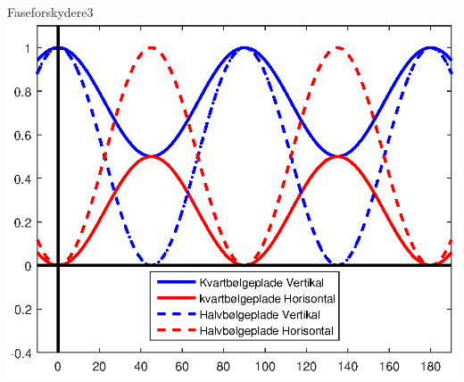 \begin{opgave}{Faseforskydere}{3}
\includegraphics[width = \textwidth]{Elektrodynamik/faseskitse.eps}
\end{opgave}